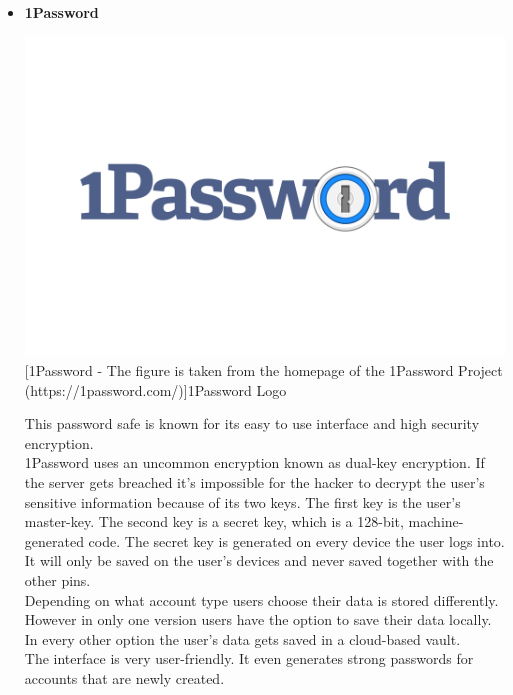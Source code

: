 \documentclass[conference]{IEEEtran}
\begin{document}
\begin{itemize}
\item \textbf{1Password}\cite{b7}\\
\begin{center}
\includegraphics[scale=0.06]{./images/1Password-Logo.wine.png}
[1Password - The figure is taken from the homepage of the 1Password Project (https://1password.com/)]{1Password Logo}
\end{center}
This password safe is known for its easy to use interface and high security encryption.\\ 
1Password uses an uncommon encryption known as dual-key encryption. If the server gets breached it's impossible for the hacker to decrypt the user's sensitive information because of its two keys. The first key is the user's master-key. The second key is a secret key, which is a 128-bit, machine-generated code. The secret key is generated on every device the user logs into. It will only be saved on the user's devices and never saved together with the other pins.\\
Depending on what account type users choose their data is stored differently. However in only one version users have the option to save their data locally. In every other option the user's data gets saved in a cloud-based vault.\\
The interface is very user-friendly. It even generates strong passwords for accounts that are newly created.

\end{itemize}
\end{document}
